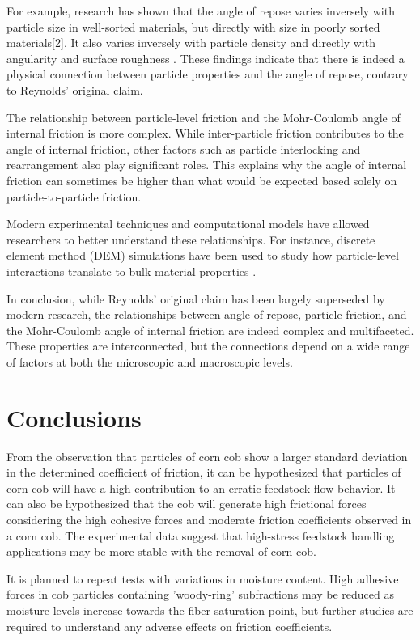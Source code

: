 \documentclass[xcolor=dvipsnames,10pt,hidelinks]{article}
\begin{document}
\begin{itemize}
For example, research has shown that the angle of repose varies inversely with particle size in well-sorted materials, but directly with size in poorly sorted materials[2]. It also varies inversely with particle density and directly with angularity and surface roughness \parencite{vanburkalow_angle_1945}.
These findings indicate that there is indeed a physical connection between particle properties and the angle of repose, contrary to Reynolds' original claim.

The relationship between particle-level friction and the Mohr-Coulomb angle of internal friction is more complex.
While inter-particle friction contributes to the angle of internal friction,
other factors such as particle interlocking and rearrangement also play significant roles.
This explains why the angle of internal friction can sometimes be higher than what would be expected based solely on particle-to-particle friction.

Modern experimental techniques and computational models have allowed researchers to better understand these relationships.
For instance, discrete element method (DEM) simulations have been used to study how particle-level interactions translate to bulk material properties \parencite{dong_microscopic_2022}.

In conclusion, while Reynolds' original claim has been largely superseded by modern research, the relationships between angle of repose, particle friction, and the Mohr-Coulomb angle of internal friction are indeed complex and multifaceted.
These properties are interconnected, but the connections depend on a wide range of factors at both the microscopic and macroscopic levels.
\end{itemize}
\section{Conclusions}
\label{sec:org255711b}
From the observation that particles of corn cob show a larger standard deviation in the determined coefficient of friction, it can be hypothesized that particles of corn cob will have a high contribution to an erratic feedstock flow behavior.
It can also be hypothesized that the cob will generate high frictional forces considering the high cohesive forces and moderate friction coefficients observed in a corn cob.
The experimental data suggest that high-stress feedstock handling applications may be more stable with the removal of corn cob.

It is planned to repeat tests with variations in moisture content.
High adhesive forces in cob particles containing 'woody-ring' subfractions may be reduced as moisture levels increase towards the fiber saturation point, but further studies are required to understand any adverse effects on friction coefficients.
\end{document}
